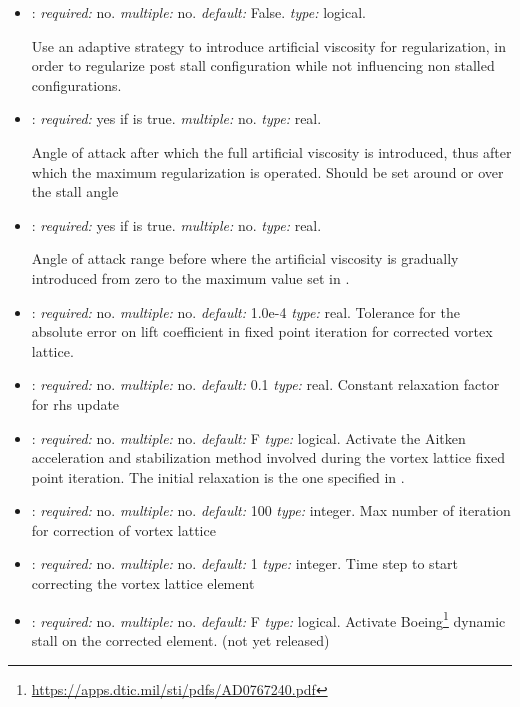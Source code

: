 \begin{itemize}
\item {}: \textit{required:} no. 
\textit{multiple:} no. \textit{default:} False. \textit{type:} logical.

Use an adaptive strategy to introduce artificial viscosity for regularization, 
in order to regularize post stall configuration while not influencing non 
stalled configurations. 

\item {}: \textit{required:} yes if 
 is true. \textit{multiple:} no. \textit{type:} real.

Angle of attack after which the full artificial viscosity is introduced, 
thus after which the maximum regularization is operated. Should be set 
around or over the stall angle

\item {}: \textit{required:} 
yes if  is true. \textit{multiple:} no. 
\textit{type:} real.

Angle of attack range before  
where the artificial viscosity is gradually introduced from zero to the maximum 
value set in .

\item {}: \textit{required:} no. \textit{multiple:} no. 
\textit{default:} 1.0e-4 \textit{type:} real. 
Tolerance for the absolute error on lift coefficient in fixed point 
iteration for corrected vortex lattice.

\item {}: \textit{required:} no. \textit{multiple:} no. 
\textit{default:} 0.1 \textit{type:} real. 
Constant relaxation factor for rhs update

\item {}: \textit{required:} no. \textit{multiple:} no. 
\textit{default:} F \textit{type:} logical. 
Activate the Aitken acceleration and stabilization method involved during the 
vortex lattice fixed point iteration. 
The initial relaxation is the one specified in . 

\item {}: \textit{required:} no. \textit{multiple:} no. 
\textit{default:} 100 \textit{type:} integer. 
Max number of iteration for correction of vortex lattice

\item {}: \textit{required:} no. \textit{multiple:} no. 
\textit{default:} 1 \textit{type:} integer. 
Time step to start correcting the vortex lattice element

\item {}: \textit{required:} no. \textit{multiple:} no. \textit{default:} F \textit{type:} logical. 
Activate Boeing\footnote{\url{https://apps.dtic.mil/sti/pdfs/AD0767240.pdf}} 
dynamic stall on the corrected  element.   (not yet released)


\end{itemize}

